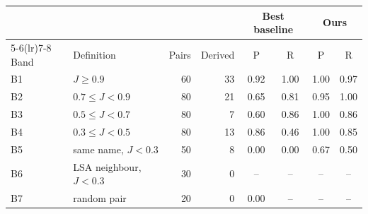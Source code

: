 \begin{tabular}{llrrcccc}
\toprule
 & & & & \multicolumn{2}{c}{Best baseline} & \multicolumn{2}{c}{Ours} \\
\cmidrule(lr){5-6}\cmidrule(lr){7-8}
Band & Definition & Pairs & Derived & P & R & P & R \\
\midrule
B1 & $J \geq 0.9$ & 60 & 33 & 0.92 & 1.00 & 1.00 & 0.97 \\
B2 & $0.7 \leq J < 0.9$ & 80 & 21 & 0.65 & 0.81 & 0.95 & 1.00 \\
B3 & $0.5 \leq J < 0.7$ & 80 & 7 & 0.60 & 0.86 & 1.00 & 0.86 \\
B4 & $0.3 \leq J < 0.5$ & 80 & 13 & 0.86 & 0.46 & 1.00 & 0.85 \\
B5 & same name, $J<0.3$ & 50 & 8 & 0.00 & 0.00 & 0.67 & 0.50 \\
B6 & LSA neighbour, $J<0.3$ & 30 & 0 & -- & -- & -- & -- \\
B7 & random pair & 20 & 0 & 0.00 & -- & -- & -- \\
\bottomrule
\end{tabular}
